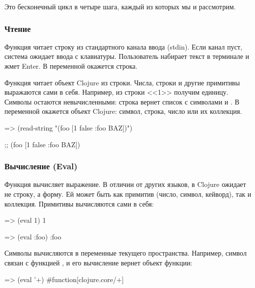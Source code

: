 Это бесконечный цикл в четыре шага, каждый из которых мы и рассмотрим.

\subsubsection{Чтение}

Функция  читает строку из стандартного канала ввода (stdin). Если канал пуст, система ожидает ввода с клавиатуры. Пользователь набирает текст в терминале и жмет Enter. В переменной  окажется строка.

Функция  читает объект Clojure из строки. Числа, строки и другие примитивы выражаются сами в себя. Например, из строки <<1>> получим единицу. Символы остаются невычисленными: строка  вернет список с символами  и . В переменной  окажется объект Clojure: символ, строка, число или их коллекция.

\begin{english}
  \begin{clojure}
=> (read-string "(foo [1 false {:foo BAZ}])")

;; (foo [1 false {:foo BAZ}])
  \end{clojure}
\end{english}

\subsubsection{Вычисление (Eval)}

Функция  вычисляет выражение. В отличии от других языков, в Clojure  ожидает не строку, а форму. Ей может быть как примитив (число, символ, кейворд), так и коллекция. Примитивы вычисляются сами в себя:

\begin{english}
  \begin{clojure}
=> (eval 1)
1

=> (eval :foo)
:foo
  \end{clojure}
\end{english}
Символы вычисляются в переменные текущего пространства. Например, символ \code{+}
связан с функцией , и его вычисление вернет объект функции:

\begin{english}
  \begin{clojure}
=> (eval '+)
#function[clojure.core/+]
  \end{clojure}
\end{english}

